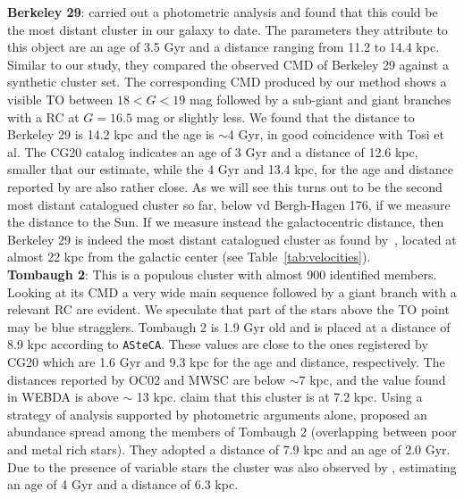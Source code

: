 \documentclass[draft]{aa}
\begin{document}
  \textbf{Berkeley 29}: \cite{Tosi_2004} carried out a photometric analysis
  and found that this could be the most distant cluster in our galaxy to date.
  The parameters they attribute to this object are an age of 3.5 Gyr and a
  distance ranging from 11.2 to 14.4 kpc.
  Similar to our study, they compared the observed CMD of Berkeley 29 against a
  synthetic cluster set. The corresponding CMD produced by our method
  shows a visible TO between $18<G<19$ mag followed by a sub-giant and giant
  branches with a RC at $G=16.5$ mag or slightly less. We found that the
  distance to Berkeley 29 is 14.2 kpc and the age is $\sim$4 Gyr, in good
  coincidence with Tosi et al. The CG20 catalog indicates an age of 3 Gyr and a
  distance of 12.6 kpc, smaller that our estimate, while the 4 Gyr and 13.4
  kpc, for the age and distance reported by \cite{Frinchaboy_2006} are also
  rather close. As we will see this turns out to be the second most
  distant catalogued cluster so far, below vd Bergh-Hagen 176, if we measure
  the distance to the Sun. If we measure instead the galactocentric distance,
  then Berkeley 29 is indeed the most distant catalogued cluster as found
  by~\cite{Tosi_2004}, located at almost 22 kpc from the galactic center (see
  Table~\ref{tab:velocities}).\\

  \textbf{Tombaugh 2}: This is a populous cluster with almost 900 identified
  members. Looking at its CMD a very wide main sequence followed by a giant
  branch with a relevant RC are evident. We speculate that part of the stars
  above the TO point may be blue stragglers. Tombaugh 2 is 1.9 Gyr old and is
  placed at a distance of 8.9 kpc according to \texttt{ASteCA}. These values are
  close to the ones registered by CG20 which are 1.6 Gyr and 9.3 kpc for the age
  and distance, respectively. The distances reported by OC02 and MWSC are below
  $\sim$7 kpc, and the value found in WEBDA is above $\sim$ 13 kpc.
  \cite{Villanova_2010} claim that this cluster is at 7.2 kpc.
  Using a strategy of analysis supported by photometric arguments alone, 
  \cite{Frinchaboy_2008} proposed an abundance spread among the members of
  Tombaugh 2 (overlapping between poor and metal rich stars). They adopted a
  distance of 7.9 kpc and an age of 2.0 Gyr.
  Due to the presence of variable stars the cluster was also observed by
  \cite{Kubiak_1992}, estimating an age of 4 Gyr and a distance of 6.3 kpc.\\
\end{document}
